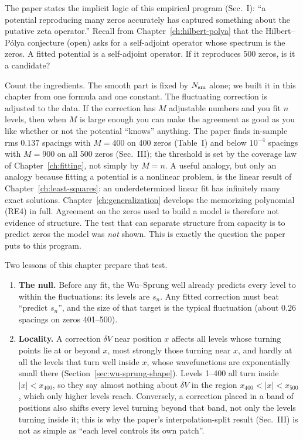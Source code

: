 The paper states the implicit logic of this empirical program (Sec.~I): ``a potential reproducing many zeros accurately has captured something about the putative zeta operator.'' Recall from Chapter~\ref{ch:hilbert-polya} that the Hilbert--P\'olya conjecture (open) asks for a self-adjoint operator whose spectrum is the zeros. A fitted potential is a self-adjoint operator. If it reproduces 500 zeros, is it a candidate?

Count the ingredients. The smooth part is fixed by $N_{\mathrm{sm}}$ alone; we built it in this chapter from one formula and one constant. The fluctuating correction is adjusted to the data. If the correction has $M$ adjustable numbers and you fit $n$ levels, then when $M$ is large enough you can make the agreement as good as you like whether or not the potential ``knows'' anything. The paper finds in-sample rms $0.137$ spacings with $M=400$ on 400 zeros (Table~I) and below $10^{-4}$ spacings with $M=900$ on all 500 zeros (Sec.~III); the threshold is set by the coverage law of Chapter~\ref{ch:fitting}, not simply by $M=n$. A useful analogy, but only an analogy because fitting a potential is a nonlinear problem, is the linear result of Chapter~\ref{ch:least-squares}: an underdetermined linear fit has infinitely many exact solutions. Chapter~\ref{ch:generalization} develops the memorizing polynomial (RE4) in full. Agreement on the zeros used to build a model is therefore not evidence of structure. The test that can separate structure from capacity is to predict zeros the model was \emph{not} shown. This is exactly the question the paper puts to this program.

Two lessons of this chapter prepare that test.
\begin{enumerate}
\item \textbf{The null.} Before any fit, the Wu--Sprung well already predicts every level to within the fluctuations: its levels are $s_n$. Any fitted correction must beat ``predict $s_n$'', and the size of that target is the typical fluctuation (about $0.26$ spacings on zeros 401--500).
\item \textbf{Locality.} A correction $\delta V$ near position $x$ affects all levels whose turning points lie at or beyond $x$, most strongly those turning near $x$, and hardly at all the levels that turn well inside $x$, whose wavefunctions are exponentially small there (Section~\ref{sec:wu-sprung-shape}). Levels 1--400 all turn inside $|x|<x_{400}$, so they say almost nothing about $\delta V$ in the region $x_{400}<|x|<x_{500}$, which only higher levels reach. Conversely, a correction placed in a band of positions also shifts every level turning beyond that band, not only the levels turning inside it; this is why the paper's interpolation-split result (Sec.~III) is not as simple as ``each level controls its own patch''.
\end{enumerate}

